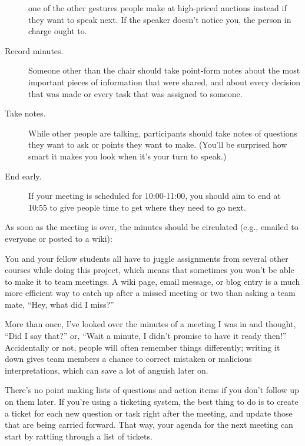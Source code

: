 \begin{description}
one of the other gestures people make at high-priced auctions
instead if they want to speak next. If the speaker doesn't notice
you, the person in charge ought to.
\item[Record minutes.]
Someone other than the chair should take point-form notes about the
most important pieces of information that were shared, and about
every decision that was made or every task that was assigned to
someone.
\item[Take notes.]
While other people are talking, participants should take notes of
questions they want to ask or points they want to make. (You'll be
surprised how smart it makes you look when it's your turn to speak.)
\item[End early.]
If your meeting is scheduled for 10:00-11:00, you should aim to end
at 10:55 to give people time to get where they need to go next.
\end{description}

As soon as the meeting is over, the minutes should be circulated (e.g.,
emailed to everyone or posted to a wiki):

\begin{description}
\tightlist
\item[People who weren't at the meeting can keep track of what's going on.]
You and your fellow students all have to juggle assignments from
several other courses while doing this project, which means that
sometimes you won't be able to make it to team meetings. A wiki
page, email message, or blog entry is a much more efficient way to
catch up after a missed meeting or two than asking a team mate,
``Hey, what did I miss?''
\item[Everyone can check what was actually said or promised.]
More than once, I've looked over the minutes of a meeting I was in
and thought, ``Did I say that?'' or, ``Wait a minute, I didn't promise
to have it ready then!'' Accidentally or not, people will often
remember things differently; writing it down gives team members a
chance to correct mistaken or malicious interpretations, which can
save a lot of anguish later on.
\item[People can be held accountable at subsequent meetings.]
There's no point making lists of questions and action items if you
don't follow up on them later. If you're using a ticketing system,
the best thing to do is to create a ticket for each new question or
task right after the meeting, and update those that are being
carried forward. That way, your agenda for the next meeting can
start by rattling through a list of tickets.
\end{description}

